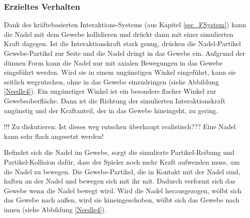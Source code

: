 


\subsubsection{Erzieltes Verhalten}

Dank des  kräftebasierten Interaktions-Systems (aus Kapitel \ref{sec_FSystem}) kann die Nadel mit dem Gewebe kollidieren und drückt dann mit einer simulierten Kraft dagegen. 
Ist die Interaktionskraft stark genug, drücken die Nadel-Partikel Gewebe-Partikel zur Seite und die Nadel dringt in das Gewebe ein.
Aufgrund der dünnen Form kann die Nadel nur mit axialen Bewegungen in das Gewebe eingeführt werden. Wird sie in einem ungünstigen Winkel eingeführt, kann sie seitlich wegrutschen, ohne in das Gewebe einzudringen (siehe Abbildung \ref{Needle4}). Ein ungünstiger Winkel ist ein besonders flacher Winkel zur Gewebeoberfläche. Dann ist die Richtung der simulierten Interaktionskraft ungünstig und der Kraftanteil, der in das Gewebe hineingeht, zu gering.

!!! Zu diskutieren: Ist dieses weg rutschen überhaupt realistisch??? Eine Nadel kann sehr flach angesetzt werden!

Befindet sich die Nadel im Gewebe, sorgt die simulierte Partikel-Reibung und Partikel-Kollision dafür, dass der Spieler noch mehr Kraft aufwenden muss, um die Nadel zu bewegen. Die Gewebe-Partikel, die in Kontakt mit der Nadel sind, haften an der Nadel und bewegen sich mit ihr mit. Dadurch verformt sich das Gewebe wenn die Nadel bewegt wird. Wird die Nadel herausgezogen, wölbt sich das Gewebe nach außen, wird sie hineingeschoben, wölbt sich das Gewebe nach innen (siehe Abbildung \ref{Needle4}).


